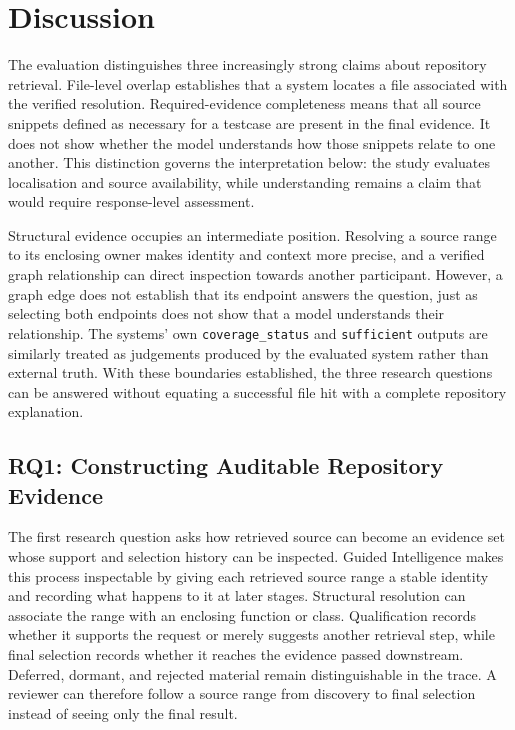 \chapter{Discussion}\label{ch:discussion}

The evaluation distinguishes three increasingly strong claims about repository retrieval. File-level overlap establishes that a system locates a file associated with the verified resolution. Required-evidence completeness means that all source snippets defined as necessary for a testcase are present in the final evidence. It does not show whether the model understands how those snippets relate to one another. This distinction governs the interpretation below: the study evaluates localisation and source availability, while understanding remains a claim that would require response-level assessment.

Structural evidence occupies an intermediate position. Resolving a source range to its enclosing owner makes identity and context more precise, and a verified graph relationship can direct inspection towards another participant. However, a graph edge does not establish that its endpoint answers the question, just as selecting both endpoints does not show that a model understands their relationship. The systems' own \texttt{coverage\_status} and \texttt{sufficient} outputs are similarly treated as judgements produced by the evaluated system rather than external truth. With these boundaries established, the three research questions can be answered without equating a successful file hit with a complete repository explanation.

\section{RQ1: Constructing Auditable Repository Evidence}\label{sec:rq1-constructing-auditable-repository-evidence}

The first research question asks how retrieved source can become an evidence set whose support and selection history can be inspected. Guided Intelligence makes this process inspectable by giving each retrieved source range a stable identity and recording what happens to it at later stages. Structural resolution can associate the range with an enclosing function or class. Qualification records whether it supports the request or merely suggests another retrieval step, while final selection records whether it reaches the evidence passed downstream. Deferred, dormant, and rejected material remain distinguishable in the trace. A reviewer can therefore follow a source range from discovery to final selection instead of seeing only the final result.

